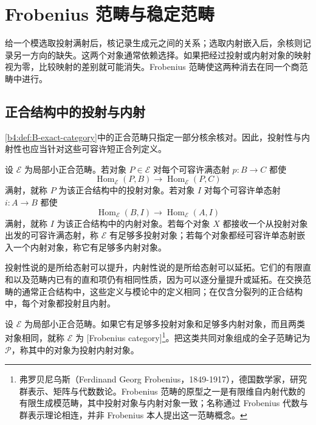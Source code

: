 
\section{Frobenius 范畴与稳定范畴}
\label{b4:sec:D01}

给一个模选取投射满射后，核记录生成元之间的关系；选取内射嵌入后，余核则记录另一方向的缺失。这两个对象通常依赖选择。如果把经过投射或内射对象的映射视为零，比较映射的差别就可能消失。Frobenius 范畴使这两种消去在同一个商范畴中进行。

\subsection{正合结构中的投射与内射}
\label{b4:subsec:D01:01}

\cref{b4:def:B-exact-category}中的正合范畴只指定一部分核余核对。因此，投射性与内射性也应当针对这些可容许短正合列定义。

\begin{definition}\label{b4:def:D-relative-projective-injective}
	设 \(\mathcal E\) 为局部小正合范畴。若对象 \(P\in\mathcal E\) 对每个可容许满态射 \(p:B\to C\) 都使
	\[
		\operatorname{Hom}_{\mathcal E}(P,B)\longrightarrow \operatorname{Hom}_{\mathcal E}(P,C)
	\]
	满射，就称 \(P\) 为该正合结构中的投射对象。若对象 \(I\) 对每个可容许单态射 \(i:A\to B\) 都使
	\[
		\operatorname{Hom}_{\mathcal E}(B,I)\longrightarrow \operatorname{Hom}_{\mathcal E}(A,I)
	\]
	满射，就称 \(I\) 为该正合结构中的内射对象。若每个对象 \(X\) 都接收一个从投射对象出发的可容许满态射，称 \(\mathcal E\) 有足够多投射对象；若每个对象都经可容许单态射嵌入一个内射对象，称它有足够多内射对象。
\end{definition}

投射性说的是所给态射可以提升，内射性说的是所给态射可以延拓。它们的有限直和以及范畴内已有的直和项仍有相同性质，因为可以逐分量提升或延拓。在交换范畴的通常正合结构中，这些定义与模论中的定义相同；在仅含分裂列的正合结构中，每个对象都投射且内射。

\begin{definition}\label{b4:def:D-frobenius-category}
	设 \(\mathcal E\) 为局部小正合范畴。如果它有足够多投射对象和足够多内射对象，而且两类对象相同，就称 \(\mathcal E\) 为 [Frobenius category]\footnote{弗罗贝尼乌斯（Ferdinand Georg Frobenius，1849-1917），德国数学家，研究群表示、矩阵与代数数论。Frobenius 范畴的原型之一是有限维自内射代数的有限生成模范畴，其中投射对象与内射对象一致；名称通过 Frobenius 代数与群表示理论相连，并非 Frobenius 本人提出这一范畴概念。}。把这类共同对象组成的全子范畴记为 \(\mathcal P\)，称其中的对象为投射内射对象。
\end{definition}


